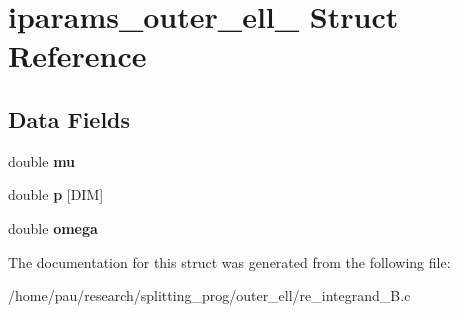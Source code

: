 \hypertarget{structiparams__outer__ell__2}{
\section{iparams\_\-outer\_\-ell\_ Struct Reference}
\label{structiparams__outer__ell__2}
}
\subsection*{Data Fields}
\begin{DoxyCompactItemize}
\item 
\hypertarget{structiparams__outer__ell__2_a74577585cf12d1712ab9c57616d49205}{
double {\bfseries mu}}
\label{structiparams__outer__ell__2_a74577585cf12d1712ab9c57616d49205}

\item 
\hypertarget{structiparams__outer__ell__2_a922729488d20297775737f3221dfb3da}{
double {\bfseries p} \mbox{[}DIM\mbox{]}}
\label{structiparams__outer__ell__2_a922729488d20297775737f3221dfb3da}

\item 
\hypertarget{structiparams__outer__ell__2_a98ecc32b7ac0cf654d9f883cbe5cab35}{
double {\bfseries omega}}
\label{structiparams__outer__ell__2_a98ecc32b7ac0cf654d9f883cbe5cab35}

\end{DoxyCompactItemize}


The documentation for this struct was generated from the following file:\begin{DoxyCompactItemize}
\item 
/home/pau/research/splitting\_\-prog/outer\_\-ell/re\_\-integrand\_\-B.c\end{DoxyCompactItemize}
